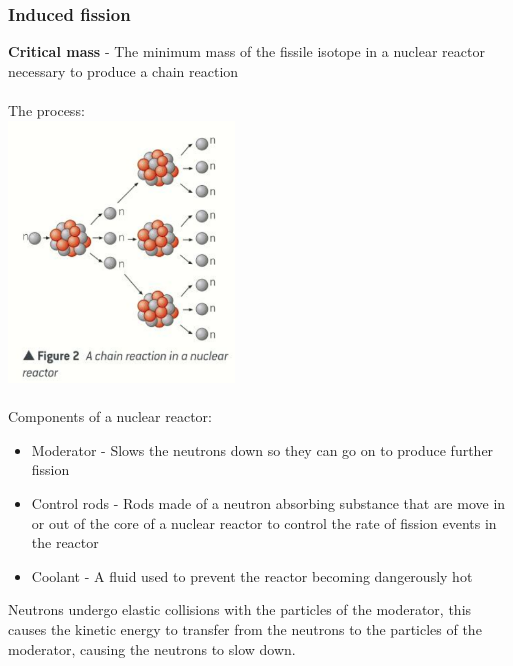 \documentclass[12pt]{article}
\begin{document}
\subsubsection{Induced fission}
\textbf{Critical mass} - The minimum mass of the fissile isotope in a nuclear reactor necessary to produce a chain reaction\\
\\
The process:\\
\includegraphics[width=6cm]{chain_reaction.png}\\
\\
Components of a nuclear reactor:
\begin{itemize}
\item Moderator - Slows the neutrons down so they can go on to produce further fission
\item Control rods - Rods made of a neutron absorbing substance that are move in or out of the core of a nuclear reactor to control the rate of fission events in the reactor
\item Coolant - A fluid used to prevent the reactor becoming dangerously hot
\end{itemize}
Neutrons undergo elastic collisions with the particles of the moderator, this causes the kinetic energy to transfer from the neutrons to the particles of the moderator, causing the neutrons to slow down.
\end{document}
